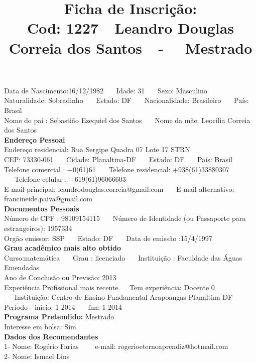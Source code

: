 \documentclass[11pt]{article}
\title{\vspace*{-4cm} Ficha de Inscrição: \\Cod: 1227\ \ Leandro Douglas Correia dos Santos\ \ - \ \ Mestrado 
 }
\date{}
\begin{document}
\maketitle
\vspace*{-1.5cm}
\noindent Data de Nascimento:16/12/1982
\ \ \ Idade: 31   \ \ \ Sexo: Masculino
\\
Naturalidade: Sobradinho  
\ \ \  Estado: DF
\ \ \  Nacionalidade: Brasileiro
\ \ \ País: Brasil
\\        
Nome do pai : Sebastião Ezequiel dos Santos
\ \ \ Nome da mãe: Leocilia Correia dos Santos          
\\[0.2cm]                     
\textbf{Endereço Pessoal} 
\\ 
\noindent Endereço residencial: Rua Sergipe Quadra 07 Lote 17 STRN
\\
        CEP: 73330-061 
\ \ \ Cidade: Planaltina-DF 
\ \ \ Estado: DF 
\ \ \ País: Brasil
\\		
		Telefone comercial : +0(61)61
\ \ \ Telefone residencial: +938(61)33880307
\ \ \ Telefone celular : +619(61)96066603
\\
E-mail principal: leandrodouglas.correia@gmail.com
\ \ \ E-mail alternativo: francineide.paiva@gmail.com 
\\[0.2cm] 
\textbf{Documentos Pessoais}
\\
\noindent Número de CPF : 98109154115
\ \ \ Número de Identidade (ou Passaporte para estrangeiros): 1957334
\\
Orgão emissor: SSP
\ \ \ Estado: DF
\ \ \ Data de emissão :15/4/1997
\\[0.3cm]
\textbf{Grau acadêmico mais alto obtido}
\\	
Curso:matemática
\ \ \ Grau : licenciado
\ \ \ Instituição : Faculdade das Águas Emendadas
\\			
Ano de Conclusão ou Previsão: 2013
\\ 
Experiência Profissional mais recente. \ \  
Tem experiência: Docente 0  
\ \ \ Instituição: Centro de Ensino Fundamental Arapoangas Planaltina DF
\\  
Período - início: 1-2014
\ \ \ fim: 1-2014
\\[0.2cm] 
\textbf{Programa Pretendido:} Mestrado\\
Interesse em bolsa: Sim
\\[0.3cm]		
\textbf{Dados dos Recomendantes} 
\\
1- Nome: Rogério Farias
\ \ \ \  e-mail: rogerioeternoaprendiz@hotmail.com 
\\
2- Nome: Ismael Lins
\end{document}
